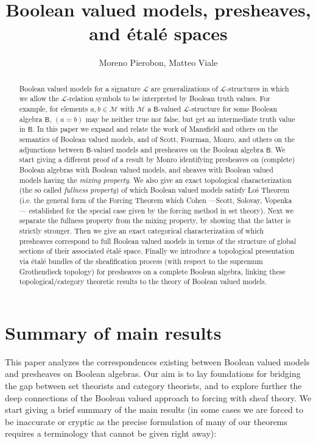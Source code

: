 \documentclass[11pt]{amsart}
\title{Boolean valued models, presheaves, and \'etal\'e spaces}
\author{Moreno Pierobon, Matteo Viale}
\theoremstyle{plain}
\theoremstyle{definition}
\theoremstyle{plain}
\theoremstyle{remark}
\newcommand{\bool}[1]{\mathsf{#1}}
\newcommand{\0}{\mathsf{0}}
\renewcommand{\1}{\mathsf{1}}
\renewcommand{\2}{\mathsf{2}}
\theoremstyle{definition}
\begin{document}
\begin{abstract}
Boolean valued models for a signature $\mathcal{L}$ are generalizations of $\mathcal{L}$-structures in which we allow the
$\mathcal{L}$-relation symbols to be interpreted by Boolean truth values. For example, for elements $a,b\in\mathcal{M}$ with
$\mathcal{M}$ a $\bool{B}$-valued $\mathcal{L}$-structure for some Boolean algebra $\bool{B}$, 
$(a=b)$ may be neither true nor false, but get 
an intermediate  truth value in $\bool{B}$. 
In this paper we expand and relate the work of Mansfield and others on the semantics of Boolean valued models, 
and of Scott, Fourman, Monro, and others on the adjunctions between $\bool{B}$-valued models and presheaves on the Boolean algebra 
$\bool{B}$.
We start giving a different proof of a result by Monro identifying presheaves on (complete) Boolean algebras with Boolean valued models, and sheaves with Boolean valued models having the \emph{mixing property}. We also give an exact topological 
characterization (the so called \emph{fullness property}) of which Boolean valued models satisfy 
\L o\'s Theorem (i.e. the general form of the Forcing Theorem
which Cohen ---Scott, Solovay, Vopenka--- established for the special case given by the forcing method in set theory).
Next we separate the fullness property from the mixing property, by showing that the latter is strictly stronger.
Then we give an exact categorical characterization of which 
presheaves correspond to full Boolean valued models in terms of the structure of global sections of their associated \'etal\'e space.
Finally we introduce a topological presentation via \'etal\'e bundles of the sheafification process (with respect to the supremum Grothendieck topology) for presheaves on a complete Boolean algebra, linking these topological/category theoretic results to the theory of Boolean valued models.

\end{abstract}

\maketitle

\section*{Summary of main results}
This paper analyzes the correspondences existing between Boolean valued models and presheaves on Boolean algebras. Our aim is to lay foundations for bridging the gap between set theorists and category theorists, and to explore further the deep connections of the Boolean valued approach to forcing 
with sheaf theory.
We start giving a brief summary of the main results (in some cases we are forced to be inaccurate or cryptic as the precise formulation of many of our theorems requires a terminology that cannot be given right away):
\end{document}
